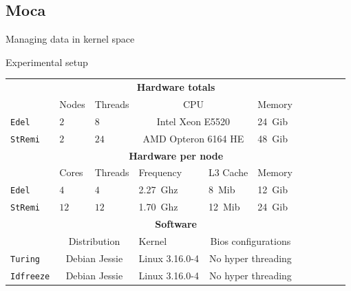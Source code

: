 \documentclass[xcolor={usenames,dvipsnames},hyperref={pdfusetitle}]{beamer}
\begin{document}
\subsection*{Moca}

\begin{frame}{Managing data in kernel space}
    \centering
    \resizebox{!}{.85\textheight}{
        
    }
\end{frame}


\begin{frame}{Experimental setup}
    \small
    \begin{tabular}{lllllllllll}
        \toprule
        & \multicolumn{5}{c}{\textbf{Hardware totals}}\\
        \cmidrule(lr){2-6}
        & Nodes & Threads & \multicolumn{2}{c}{CPU} & Memory \\
        \cmidrule(lr){2-6}
        \texttt{Edel}    & $2$ & $8$  & \multicolumn{2}{c}{Intel Xeon E5520}      & \SI{24}{Gib} \\
        \texttt{StRemi} & $2$ & $24$ & \multicolumn{2}{c}{AMD Opteron 6164 HE }& \SI{48}{Gib} \\
        \midrule
        & \multicolumn{5}{c}{\textbf{Hardware per node}}\\
        \cmidrule(lr){2-6}
        & Cores & Threads & Frequency & L3 Cache & Memory \\
        \cmidrule(lr){2-6}
        \texttt{Edel}   & $4$  & $4$   & \SI{2.27}{Ghz}& \SI{8}{Mib}  & \SI{12}{Gib} \\
        \texttt{StRemi} & $12$ & $12$  & \SI{1.70}{Ghz}& \SI{12}{Mib} & \SI{24}{Gib}\\
        \midrule
        & \multicolumn{5}{c}{\textbf{Software}}\\
        \cmidrule(lr){2-6}
        & \multicolumn{2}{c}{Distribution} & Kernel &
            \multicolumn{2}{c}{Bios configurations} \\
        \cmidrule(lr){2-6}
        \texttt{Turing}   & \multicolumn{2}{c}{Debian Jessie} & Linux 3.16.0-4 &
            \multicolumn{2}{c}{No hyper threading} \\
        \texttt{Idfreeze} & \multicolumn{2}{c}{Debian Jessie} & Linux 3.16.0-4 &
            \multicolumn{2}{c}{No hyper threading}\\
        \bottomrule
    \end{tabular}
\end{frame}
\end{document}
